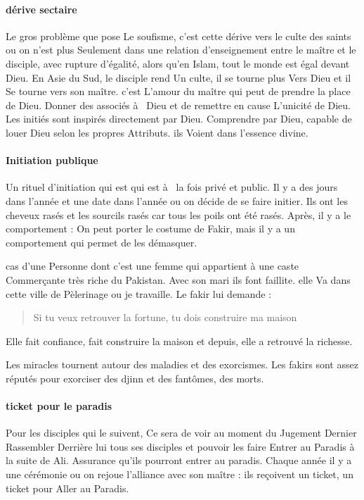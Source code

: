 \paragraph{dérive sectaire} 
Le gros problème que pose 
Le soufisme, c'est cette dérive vers le culte des saints ou on n'est plus 
Seulement dans une relation d'enseignement entre le maître 
et le disciple, avec rupture d'égalité, alors qu'en Islam, tout le monde est égal devant Dieu. 
En Asie du Sud, le disciple rend 
Un culte, il se tourne plus 
Vers Dieu et il 
Se tourne vers son maître. c'est 
L'amour du maître qui peut de prendre la place de Dieu. Donner des associés à  Dieu et  de remettre 
en cause 
L'unicité 
de Dieu.
Les initiés sont inspirés directement par Dieu. Comprendre par Dieu, capable de louer Dieu selon les propres 
Attributs. ils Voient dans l'essence divine.

\paragraph{Initiation publique}
Un rituel d'initiation qui  est qui  est à  la fois privé et public. Il y a des jours dans l'année et une date dans l'année ou on décide de se faire initier. Ils ont les cheveux rasés et les sourcils rasés car tous les poils ont été rasés. 
Après, il y a 
le comportement : On peut porter le costume de Fakir, mais il y a un comportement qui permet de les démasquer.
\begin{Ex}
  cas d'une 
Personne dont c'est une femme qui  appartient 
à  une caste 
Commerçante très riche du Pakistan. Avec son mari ils font faillite.  elle 
Va dans cette ville de 
Pèlerinage ou je travaille. Le fakir lui demande : 
\begin{quote}
    Si tu veux retrouver la fortune, tu dois construire ma maison  
\end{quote}
Elle fait confiance, fait construire la maison et depuis, elle a retrouvé la richesse.
\end{Ex}
Les miracles tournent autour des maladies et des exorcismes. 
Les fakirs sont assez réputés pour exorciser des djinn et des fantômes, des morts. 

\paragraph{ticket pour le paradis}  Pour les disciples qui  le suivent, 
Ce sera de voir au moment du Jugement 
Dernier 
Rassembler 
Derrière lui tous ses disciples et pouvoir les faire 
Entrer au 
Paradis à  la suite de Ali. Assurance qu'ils pourront 
entrer au paradis. Chaque année il y a une cérémonie ou on rejoue l'alliance avec son maître : ils reçoivent un ticket, un ticket pour 
Aller au 
Paradis. 


